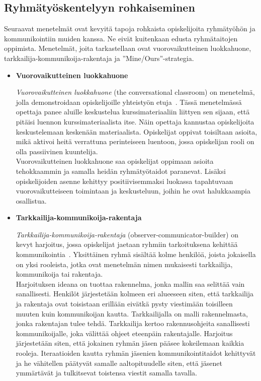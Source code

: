 \documentclass[finnish]{../tktltiki2}
\theoremstyle{definition}
\theoremstyle{remark}
\begin{document}
\subsection{Ryhmätyöskentelyyn rohkaiseminen}

Seuraavat menetelmät ovat kevyitä tapoja rohkaista opiskelijoita
ryhmätyöhön ja kommunikointiin muiden kanssa. Ne eivät kuitenkaan
edusta ryhmätaitojen oppimista. Menetelmät, joita tarkastellaan
ovat vuorovaikutteinen luokkahuone, tarkkailija-kommunikoija-rakentaja ja ''Mine/Ours''-strategia.


\begin{itemize}

\item {\bf Vuorovaikutteinen luokkahuone}

\emph{Vuorovaikutteinen luokkahuone} (the conversational classroom) on menetelmä, jolla demonstroidaan opiskelijoille yhteistyön etuja~\cite{Waite:2004:SCV:1028174.971308}. Tässä menetelmässä opettaja panee aluille keskustelua kurssimateriaaliin liittyen sen sijaan, että pitäisi luennon kurssimateriaalista itse. Näin opettaja kannustaa opiskelijoita keskustelemaan keskenään materiaalista. Opiskelijat oppivat toisiltaan asioita, mikä
aktivoi heitä verrattuna perinteiseen luentoon, jossa opiskelijan
rooli on olla passiivinen kuuntelija.\\

Vuorovaikutteinen luokkahuone saa opiskelijat oppimaan asioita tehokkaammin ja samalla heidän ryhmätyötaidot paranevat.
Lisäksi opiskelijoiden asenne kehittyy positiivisemmaksi luokassa tapahtuvaan vuorovaikutteiseen toimintaan ja keskusteluun, joihin he ovat halukkaampia osallistua.

\item {\bf Tarkkailija-kommunikoija-rakentaja}

\emph{Tarkkailija-kommunikoija-rakentaja} (observer-communicator-builder) on kevyt harjoitus, jossa
opiskelijat jaetaan ryhmiin tarkoituksena kehittää
kommunikointia~\cite{Cushing:2003:TBP:948785.948797}. Yksittäinen
ryhmä sisältää kolme henkilöä, joista jokaisella on yksi
rooleista, jotka ovat menetelmän nimen mukaisesti tarkkailija, kommunikoija tai rakentaja.\\

Harjoituksen ideana on tuottaa rakennelma, jonka mallin saa selittää vain sanallisesti. Henkilöt järjestetään
kolmeen eri alueeseen siten, että tarkkailija ja rakentaja ovat
toisistaan erillään eivätkä pysty viestimään toisilleen muuten
kuin kommunikoijan kautta. Tarkkailijalla on malli rakennelmasta,
jonka rakentajan tulee tehdä. Tarkkailija kertoo rakennusohjeita
sanallisesti kommunikoijalle, joka välittää ohjeet eteenpäin rakentajalle. Harjoitus järjestetään siten, että jokainen ryhmän
jäsen pääsee kokeilemaan kaikkia rooleja. Iteraatioiden kautta
ryhmän jäsenien kommunikointitaidot kehittyvät ja he vähitellen päätyvät samalle aaltopituudelle siten, että jäsenet ymmärtävät ja tulkitsevat toistensa viestit samalla tavalla.


\end{itemize}
\end{document}
